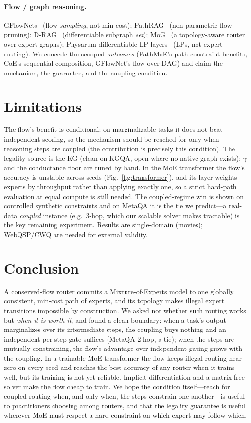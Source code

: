 \documentclass{article} %
\begin{document}
\paragraph{Flow / graph reasoning.} GFlowNets~\citep{bengio2021gflownet} (flow \emph{sampling}, not min-cost);
PathRAG~\citep{pathrag} (non-parametric flow pruning); D-RAG~\citep{drag} (differentiable subgraph \emph{set}); MoG~\citep{mog} (a topology-aware
router over expert graphs); Physarum differentiable-LP layers~\citep{physarumlp} (LPs, not expert routing). We concede the scooped
\emph{outcomes} (PathMoE's path-constraint benefits, CoE's sequential composition, GFlowNet's
flow-over-DAG) and claim the mechanism, the guarantee, and the coupling condition.

\section{Limitations}
The flow's benefit is conditional: on marginalizable tasks it does not beat independent scoring, so
the mechanism should be reached for only when reasoning steps are coupled (the contribution is
precisely this condition). The legality source is the KG (clean on KGQA, open where no native graph
exists); $\gamma$ and the conductance floor are tuned by hand. In the MoE transformer the flow's
accuracy is unstable across seeds (Fig.~\ref{fig:transformer}), and its layer weights experts by
throughput rather than applying exactly one, so a strict hard-path evaluation at equal compute is
still needed. The coupled-regime
win is shown on controlled synthetic constraints and on MetaQA it is the tie we predict---a
real-data \emph{coupled} instance (e.g.\ 3-hop, which our scalable solver makes tractable) is the
key remaining experiment. Results are single-domain (movies); WebQSP/CWQ are needed for external
validity.

\section{Conclusion}
A conserved-flow router commits a Mixture-of-Experts model to one globally consistent, min-cost
path of experts, and its topology makes illegal expert transitions impossible by construction. We
asked not whether such routing works but \emph{when it is worth it}, and found a clean boundary:
when a task's output marginalizes over its intermediate steps, the coupling buys nothing and an
independent per-step gate suffices (MetaQA 2-hop, a tie); when the steps are mutually constraining,
the flow's advantage over independent gating grows with the coupling. In a trainable MoE
transformer the flow keeps illegal routing near zero on every seed and reaches the best accuracy of
any router when it trains well, but its training is not yet reliable. Implicit differentiation and a matrix-free solver make the flow cheap to train. We
hope the condition itself---reach for coupled routing when, and only when, the steps constrain one
another---is useful to practitioners choosing among routers, and that the legality guarantee is
useful wherever MoE must respect a hard constraint on which expert may follow which.
\end{document}
